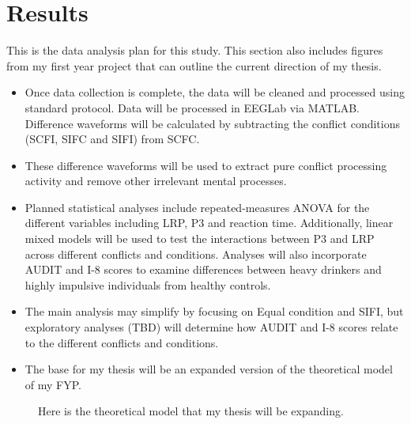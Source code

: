 \section{Results}
This is the data analysis plan for this study. This section also includes figures from my first year project that can outline the current direction of my thesis. 
\begin{itemize}
	\item Once data collection is complete, the data will be cleaned and processed using standard protocol. Data will be processed in EEGLab via MATLAB. Difference waveforms will be calculated by subtracting the conflict conditions (SCFI, SIFC and SIFI) from SCFC.
	\item These difference waveforms will be used to extract pure conflict processing activity and remove other irrelevant mental processes. 
	\item Planned statistical analyses include repeated-measures ANOVA for the different variables including LRP, P3 and reaction time. Additionally, linear mixed models will be used to test the interactions between P3 and LRP across different conflicts and conditions. Analyses will also incorporate AUDIT and I-8 scores to examine differences between heavy drinkers and highly impulsive individuals from healthy controls. 
	\item The main analysis may simplify by focusing on Equal condition and SIFI, but exploratory analyses (TBD) will determine how AUDIT and I-8 scores relate to the different conflicts and conditions. 
	\item The base for my thesis will be an expanded version of the theoretical model of my FYP.
\end{itemize}
\begin{figure}[ht!]
\centering
{}
\caption{Here is the theoretical model that my thesis will be expanding.}
\label{fig:FYP} 
\end{figure}

